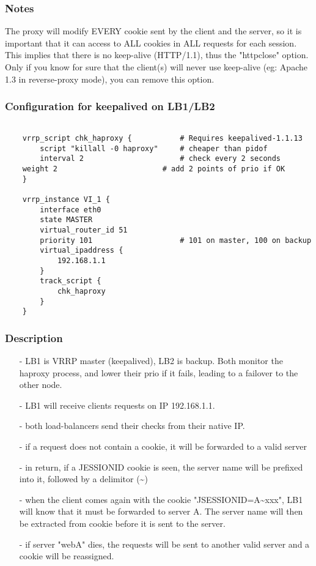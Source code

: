 \subsubsection{Notes}

The proxy will modify EVERY cookie sent by the client and the server,
so it is important that it can access to ALL cookies in ALL requests for
each session. This implies that there is no keep-alive (HTTP/1.1), thus the
"httpclose" option. Only if you know for sure that the client(s) will never
use keep-alive (eg: Apache 1.3 in reverse-proxy mode), you can remove this
option.

\subsubsection{Configuration for keepalived on LB1/LB2}

\begin{verbatim}

    vrrp_script chk_haproxy {           # Requires keepalived-1.1.13
        script "killall -0 haproxy"     # cheaper than pidof
        interval 2                      # check every 2 seconds
	weight 2                        # add 2 points of prio if OK
    }

    vrrp_instance VI_1 {
        interface eth0
        state MASTER
        virtual_router_id 51
        priority 101                    # 101 on master, 100 on backup
        virtual_ipaddress {
            192.168.1.1
        }
        track_script {
            chk_haproxy
        }
    }
\end{verbatim}

\subsubsection{Description}

\begin{itemize}
\item[-] LB1 is VRRP master (keepalived), LB2 is backup. Both monitor the haproxy
   process, and lower their prio if it fails, leading to a failover to the
   other node.
\item[-] LB1 will receive clients requests on IP 192.168.1.1.
\item[-] both load-balancers send their checks from their native IP.
\item[-] if a request does not contain a cookie, it will be forwarded to a valid
   server
\item[-] in return, if a JESSIONID cookie is seen, the server name will be prefixed
   into it, followed by a delimitor (\~{})
\item[-] when the client comes again with the cookie "JSESSIONID=A\~{}xxx", LB1 will
   know that it must be forwarded to server A. The server name will then be
   extracted from cookie before it is sent to the server.
\item[-] if server "webA" dies, the requests will be sent to another valid server
   and a cookie will be reassigned.
\end{itemize}

